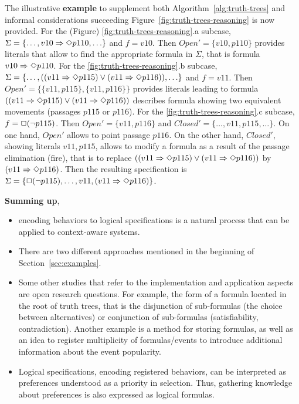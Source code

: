 \documentclass[runningheads,a4paper]{llncs}
\begin{document}
The illustrative \textbf{example}
to supplement both Algorithm~\ref{alg:truth-trees}
and informal considerations succeeding Figure~\ref{fig:truth-trees-reasoning}
is now provided.
For the (Figure) \ref{fig:truth-trees-reasoning}.a subcase,
$\Sigma=\{ \ldots, v10 \Rightarrow \Diamond p110, \ldots\}$ and
$f=v10$.
Then $Open'=\{v10,p110\}$ provides literals that
allow to find the appropriate formula in $\Sigma$,
that is formula $v10 \Rightarrow \Diamond p110$.
For the \ref{fig:truth-trees-reasoning}.b subcase,
$\Sigma=\{ \ldots, ((v11 \Rightarrow\Diamond p115) \vee (v11 \Rightarrow\Diamond p116)), \ldots\}$ and
$f=v11$.
Then $Open'=\{\{v11,p115\},\{v11,p116\}\}$ provides literals leading
to formula $((v11 \Rightarrow\Diamond p115) \vee (v11 \Rightarrow\Diamond p116))$ describes
formula showing two equivalent movements (passages $p115$ or $p116$).
For the \ref{fig:truth-trees-reasoning}.c subcase,
$f=\Box(\neg p115)$.
Then $Open'=\{v11,p116\}$ and $Closed'=\{\ldots,v11,p115,\dots\}$.
On one hand, $Open'$ allows to point passage $p116$.
On the other hand,
$Closed'$,
showing literals $v11,p115$,
allows to modify a formula as a result of the passage elimination (fire),
that is to replace $((v11 \Rightarrow\Diamond p115) \vee (v11 \Rightarrow\Diamond p116))$ by
$(v11 \Rightarrow\Diamond p116)$.
Then the resulting specification is
$\Sigma = \{\Box(\neg p115), \ldots, v11, (v11 \Rightarrow\Diamond p116)\}$.

\textbf{Summing up},
\begin{itemize}
  \item encoding behaviors to logical specifications is a natural process that can be applied to context-aware systems.
  \item There are two different approaches mentioned in the beginning of Section~\ref{sec:examples}.
  \item Some other studies that refer to the implementation and application aspects are open research questions.
        For example,
        the form of a formula located in the root of truth trees,
        that is the disjunction of sub-formulas (the choice between alternatives) or
        conjunction of sub-formulas (satisfiability, contradiction).
        Another example is a method for storing formulas,
        as well as an idea to register multiplicity of formulas/events
        to introduce additional information about the event popularity.
  \item Logical specifications, encoding registered behaviors,
        can be interpreted as preferences understood as a priority in selection.
Thus, gathering knowledge about preferences is also expressed as logical formulas.
\end{itemize}
\end{document}
